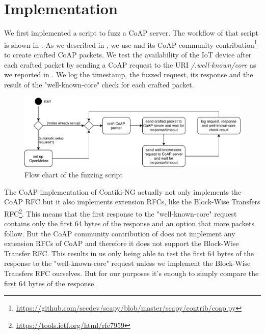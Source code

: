 \section{Implementation}
\label{section:implementation}


We first implemented a script to fuzz a CoAP server. The workflow of that script is shown in . As we described in , we use \scapy and its CoAP community contribution\footnote{\url{https://github.com/secdev/scapy/blob/master/scapy/contrib/coap.py}} to create crafted CoAP packets. We test the availability of the IoT device after each crafted packet by sending a CoAP request to the URI \textit{/.well-known/core} as we reported in . We log the timestamp, the fuzzed request, its response and the result of the "well-known-core" check for each crafted packet.

\begin{figure}
	\centering
	\includegraphics[width=\textwidth]{images/fuzzing_flow_chart}
	\caption{Flow chart of the fuzzing script}
	\label{figure:fuzz_flow_chart}
\end{figure}

The CoAP implementation of Contiki-NG actually not only implements the CoAP RFC but it also implements extension RFCs, like the Block-Wise Transfers RFC\footnote{\url{https://tools.ietf.org/html/rfc7959}}. This means that the first response to the "well-known-core" request contains only the first 64 bytes of the response and an option that more packets follow. But the CoAP community contribution of \scapy does not implement any extension RFCs of CoAP and therefore it does not support the Block-Wise Transfer RFC. This results in us only being able to test the first 64 bytes of the response to the "well-known-core" request unless we implement the Block-Wise Transfers RFC ourselves. But for our purposes it's enough to simply compare the first 64 bytes of the response.

